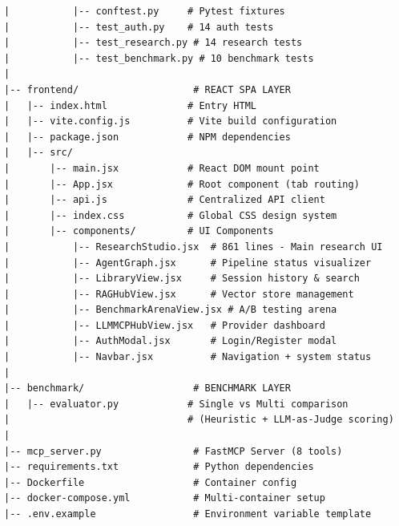 \documentclass[11pt,a4paper,twoside]{report}
\begin{document}
\begin{lstlisting}[style=pythonstyle,caption={Complete Project Structure --- Har File Ka Purpose},language={}]
|           |-- conftest.py     # Pytest fixtures
|           |-- test_auth.py    # 14 auth tests
|           |-- test_research.py # 14 research tests
|           |-- test_benchmark.py # 10 benchmark tests
|
|-- frontend/                    # REACT SPA LAYER
|   |-- index.html              # Entry HTML
|   |-- vite.config.js          # Vite build configuration
|   |-- package.json            # NPM dependencies
|   |-- src/
|       |-- main.jsx            # React DOM mount point
|       |-- App.jsx             # Root component (tab routing)
|       |-- api.js              # Centralized API client
|       |-- index.css           # Global CSS design system
|       |-- components/         # UI Components
|           |-- ResearchStudio.jsx  # 861 lines - Main research UI
|           |-- AgentGraph.jsx      # Pipeline status visualizer
|           |-- LibraryView.jsx     # Session history & search
|           |-- RAGHubView.jsx      # Vector store management
|           |-- BenchmarkArenaView.jsx # A/B testing arena
|           |-- LLMMCPHubView.jsx   # Provider dashboard
|           |-- AuthModal.jsx       # Login/Register modal
|           |-- Navbar.jsx          # Navigation + system status
|
|-- benchmark/                   # BENCHMARK LAYER
|   |-- evaluator.py            # Single vs Multi comparison
|                               # (Heuristic + LLM-as-Judge scoring)
|
|-- mcp_server.py                # FastMCP Server (8 tools)
|-- requirements.txt             # Python dependencies
|-- Dockerfile                   # Container config
|-- docker-compose.yml           # Multi-container setup
|-- .env.example                 # Environment variable template
\end{lstlisting}
\end{document}
